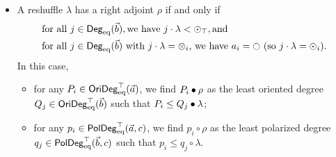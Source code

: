 \documentclass[a4paper]{memoir}
\begin{document}
\begin{theorem}
\begin{enumerate}
\begin{itemize}
			\item A reshuffle $\lambda$ has a right adjoint $\rho$ if and only if
			\begin{align}
				&\text{for all } j \in \Degeq(\vec b), \text{we have } j \cdot \lambda < \nonpol_\top, \text{and} \label{eq:poresh-withr-crit1} \\
				&\text{for all } j \in \Degeq(\vec b) \text{ with } j \cdot \lambda = \mixpol_i \text{, we have } a_i = \npolar \text{ (so $j \cdot \lambda = \nonpol_i$)}. \label{eq:poresh-withr-crit2}
			\end{align}
			In this case,
			\begin{itemize}
				\item for any $P_i \in \mathsf{OriDeg}_{\mathrm{eq}}^\top(\vec a)$, we find $P_i \mathbin{\bullet} \rho$ as the least oriented degree $Q_j \in \mathsf{OriDeg}_{\mathrm{eq}}^\top(\vec b)$ such that $P_i \leq Q_j \mathbin{\bullet} \lambda$;
				\item for any $p_i \in \mathsf{PolDeg}_{\mathrm{eq}}^\top(\vec a, c)$, we find $p_i \circ \rho$ as the least polarized degree $q_j \in \mathsf{PolDeg}_{\mathrm{eq}}^\top(\vec b, c)$ such that $p_i \leq q_j \circ \lambda$.
			\end{itemize}
		\end{itemize}
	\end{enumerate}
\end{theorem}
\end{document}
